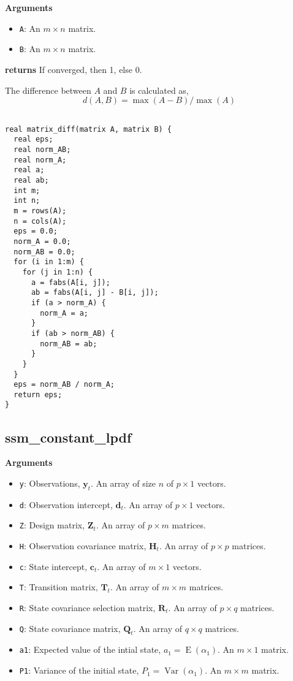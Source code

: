 \documentclass[]{book}
\providecommand{\tightlist}{%
  \setlength{\itemsep}{0pt}\setlength{\parskip}{0pt}}
\DeclareMathOperator{\E}{E}
\DeclareMathOperator{\Var}{Var}
\newcommand{\mat}[1]{\boldsymbol{#1}}
\renewcommand{\vec}[1]{\boldsymbol{#1}}
\begin{document}
\textbf{Arguments}

\begin{itemize}
\tightlist
\item
  \texttt{A}: An \(m \times n\) matrix.
\item
  \texttt{B}: An \(m \times n\) matrix.
\end{itemize}

\textbf{returns} If converged, then 1, else 0.

The difference between \(A\) and \(B\) is calculated as, \[
d(A, B) = \max(A - B) / \max(A)
\]

\begin{verbatim}

real matrix_diff(matrix A, matrix B) {
  real eps;
  real norm_AB;
  real norm_A;
  real a;
  real ab;
  int m;
  int n;
  m = rows(A);
  n = cols(A);
  eps = 0.0;
  norm_A = 0.0;
  norm_AB = 0.0;
  for (i in 1:m) {
    for (j in 1:n) {
      a = fabs(A[i, j]);
      ab = fabs(A[i, j] - B[i, j]);
      if (a > norm_A) {
        norm_A = a;
      }
      if (ab > norm_AB) {
        norm_AB = ab;
      }
    }
  }
  eps = norm_AB / norm_A;
  return eps;
}

\end{verbatim}

\subsection{ssm\_constant\_lpdf}\label{ssm_constant_lpdf}

\textbf{Arguments}

\begin{itemize}
\tightlist
\item
  \texttt{y}: Observations, \(\vec{y}_t\). An array of size \(n\) of
  \(p \times 1\) vectors.
\item
  \texttt{d}: Observation intercept, \(\vec{d}_t\). An array of
  \(p \times 1\) vectors.
\item
  \texttt{Z}: Design matrix, \(\mat{Z}_t\). An array of \(p \times m\)
  matrices.
\item
  \texttt{H}: Observation covariance matrix, \(\mat{H}_t\). An array of
  \(p \times p\) matrices.
\item
  \texttt{c}: State intercept, \(\vec{c}_t\). An array of \(m \times 1\)
  vectors.
\item
  \texttt{T}: Transition matrix, \(\mat{T}_t\). An array of
  \(m \times m\) matrices.
\item
  \texttt{R}: State covariance selection matrix, \(\mat{R} _t\). An
  array of \(p \times q\) matrices.
\item
  \texttt{Q}: State covariance matrix, \(\mat{Q}_t\). An array of
  \(q \times q\) matrices.
\item
  \texttt{a1}: Expected value of the intial state,
  \(a_1 = \E(\alpha_1)\). An \(m \times 1\) matrix.
\item
  \texttt{P1}: Variance of the initial state, \(P_1 = \Var(\alpha_1)\).
  An \(m \times m\) matrix.
\end{itemize}
\end{document}
